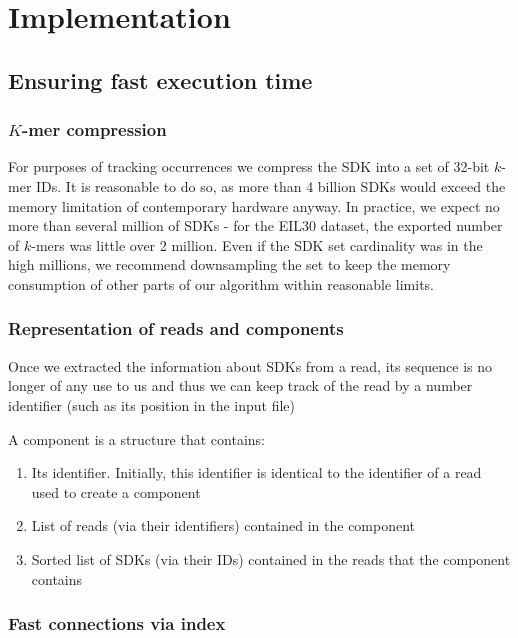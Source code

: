 \chapter{Implementation}

\section{Ensuring fast execution time}

\subsection{$K$-mer compression}

For purposes of tracking occurrences we compress the SDK  into a set of 32-bit $k$-mer IDs. It is reasonable to do so, as more than 4 billion SDKs would exceed the memory limitation of contemporary hardware anyway. In practice, we expect no more than several million of SDKs - for the EIL30 dataset, the exported number of $k$-mers was little over 2 million. Even if the SDK set cardinality was in the high millions, we recommend downsampling the set to keep the memory consumption of other parts of our algorithm within reasonable limits.

\subsection{Representation of reads and components}

Once we extracted the information about SDKs from a read, its sequence is no longer of any use to us and thus we can keep track of the read by a number identifier (such as its position in the input file)

A component is a structure that contains:
\begin{enumerate}
	\item Its identifier. Initially, this identifier is identical to the identifier of a read used to create a component
	\item List of reads (via their identifiers) contained in the component
	\item Sorted list of SDKs (via their IDs) contained in the reads that the component contains
\end{enumerate}


\subsection{Fast connections via index}

